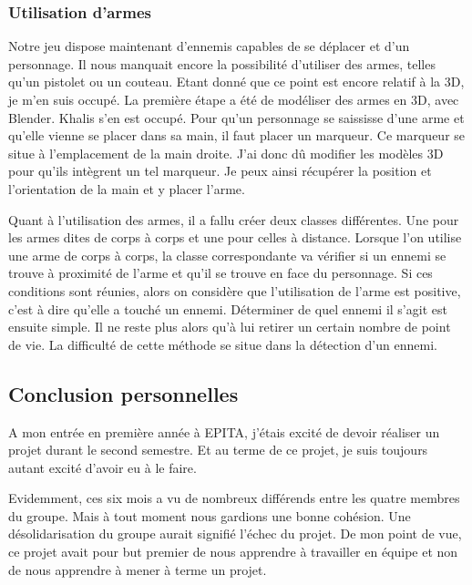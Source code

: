 \documentclass[12pt]{article}
\begin{document}
\subsubsection{Utilisation d'armes}

Notre jeu dispose maintenant d'ennemis capables de se déplacer et d'un personnage. Il nous manquait encore la possibilité d'utiliser des armes, telles qu'un pistolet ou un couteau. Etant donné que ce point est encore relatif à la 3D, je m'en suis occupé. La première étape a été de modéliser des armes en 3D, avec Blender. Khalis s'en est occupé. Pour qu'un personnage se saississe d'une arme et qu'elle vienne se placer dans sa main, il faut placer un marqueur. Ce marqueur se situe à l'emplacement de la main droite. J'ai donc dû modifier les modèles 3D pour qu'ils intègrent un tel marqueur. Je peux ainsi récupérer la position et l'orientation de la main et y placer l'arme.

Quant à l'utilisation des armes, il a fallu créer deux classes différentes. Une pour les armes dites de corps à corps et une pour celles à distance. Lorsque l'on utilise une arme de corps à corps, la classe correspondante va vérifier si un ennemi se trouve à proximité de l'arme et qu'il se trouve en face du personnage. Si ces conditions sont réunies, alors on considère que l'utilisation de l'arme est positive, c'est à dire qu'elle a touché un ennemi. Déterminer de quel ennemi il s'agit est ensuite simple. Il ne reste plus  alors qu'à lui retirer un certain nombre de point de vie. La difficulté de cette méthode se situe dans la détection d'un ennemi. 




\newpage

\subsection{Conclusion personnelles}

A mon entrée en première année à EPITA, j'étais excité de devoir réaliser un projet durant le second semestre. Et au terme de ce projet, je suis toujours autant excité d'avoir eu à le faire. 

Evidemment, ces six mois a vu de nombreux différends entre les quatre membres du groupe. Mais à tout moment nous gardions une bonne cohésion. Une désolidarisation du groupe aurait signifié l'échec du projet. De mon point de vue, ce projet avait pour but premier de nous apprendre à travailler en équipe et non de nous apprendre à mener à terme un projet. 
\end{document}
